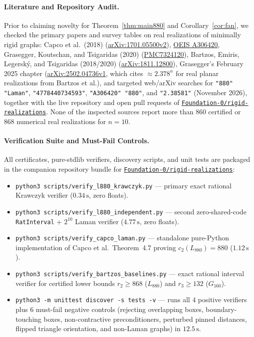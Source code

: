 \documentclass[11pt,a4paper]{article}
\theoremstyle{definition}
\theoremstyle{remark}
\begin{document}
\paragraph{Literature and Repository Audit.}
Prior to claiming novelty for Theorem~\ref{thm:main880} and Corollary~\ref{cor:fan}, we checked the primary papers and survey tables on real realizations of minimally rigid graphs: Capco et al.\ (2018) \cite{CGGKLS18} (\href{https://arxiv.org/html/1701.05500v2}{arXiv:1701.05500v2}), \href{https://oeis.org/A306420}{OEIS A306420}, Grasegger, Koutschan, and Tsigaridas (2020) \cite{GKT20} (\href{https://pmc.ncbi.nlm.nih.gov/articles/PMC7324120/}{PMC7324120}), Bartzos, Emiris, Legersk\'{y}, and Tsigaridas (2018/2020) \cite{BELT18} (\href{https://arxiv.org/pdf/1811.12800}{arXiv:1811.12800}), Grasegger's February 2025 chapter \cite{Gra25} (\href{https://arxiv.org/html/2502.04736v1}{arXiv:2502.04736v1}, which cites $\approx 2.378^n$ for real planar realizations from Bartzos et al.), and targeted web/arXiv searches for \texttt{"880" "Laman"}, \texttt{"4778440734593"}, \texttt{"A306420" "880"}, and \texttt{"2.38581"} (November 2026), together with the live repository and open pull requests of \href{https://github.com/Foundation-0/rigid-realizations}{\texttt{Foundation-0/rigid-realizations}}. None of the inspected sources report more than $860$ certified or $868$ numerical real realizations for $n = 10$.

\paragraph{Verification Suite and Must-Fail Controls.}
All certificates, pure-stdlib verifiers, discovery scripts, and unit tests are packaged in the companion repository bundle for \href{https://github.com/Foundation-0/rigid-realizations}{\texttt{Foundation-0/rigid-realizations}}:
{\sloppy\begin{itemize}
\setlength{\itemsep}{2pt}
\item \texttt{python3 scripts/verify\_l880\_krawczyk.py} --- primary exact rational Krawczyk verifier ($0.34\,\text{s}$, zero floats).
\item \texttt{python3 scripts/verify\_l880\_independent.py} --- second zero-shared-code \texttt{RatInterval} + $2^{10}$ Laman verifier ($4.77\,\text{s}$, zero floats).
\item \texttt{python3 scripts/verify\_capco\_laman.py} --- standalone pure-Python implementation of Capco et al.\ Theorem~4.7 proving $c_2(L_{880}) = 880$ ($1.12\,\text{s}$).
\item \texttt{python3 scripts/verify\_bartzos\_baselines.py} --- exact rational interval verifier for certified lower bounds $r_2 \ge 868$ ($L_{880}$) and $r_3 \ge 132$ ($G_{160}$).
\item \texttt{python3 -m unittest discover -s tests -v} --- runs all $4$ positive verifiers plus $6$ must-fail negative controls (rejecting overlapping boxes, boundary-touching boxes, non-contractive preconditioners, perturbed pinned distances, flipped triangle orientation, and non-Laman graphs) in $12.5\,\text{s}$.
\end{itemize}}
\end{document}
